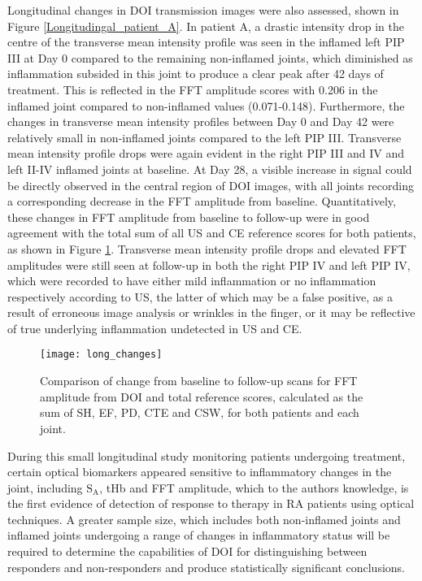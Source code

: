\documentclass[twoside]{bhamthesis}
\theoremstyle{definition}
\begin{document}
Longitudinal changes in DOI transmission images were also assessed, shown in Figure \ref{Longitudingal_patient_A}. In patient A, a drastic intensity drop in the centre of the transverse mean intensity profile was seen in the inflamed left PIP III at Day 0 compared to the remaining non-inflamed joints, which diminished as inflammation subsided in this joint to produce a clear peak after 42 days of treatment. This is reflected in the FFT amplitude scores with 0.206 in the inflamed joint compared to non-inflamed values (0.071-0.148). Furthermore, the changes in transverse mean intensity profiles between Day 0 and Day 42 were relatively small in non-inflamed joints compared to the left PIP III. Transverse mean intensity profile
drops were again evident in the right PIP III and IV and left II-IV inflamed joints at baseline. At Day 28, a visible increase in signal could be directly observed in the central region of DOI images, with all joints recording a corresponding decrease in the FFT amplitude from baseline. Quantitatively, these changes in FFT amplitude from baseline to follow-up were in good agreement with the total sum of all US and CE reference scores for both patients, as shown in Figure \ref{long_changes}. Transverse mean intensity profile
drops and elevated FFT amplitudes were still seen at follow-up in both the right PIP IV and left PIP IV, which were recorded to have either mild inflammation or no inflammation respectively according to US, the latter of which may be a false positive, as a result of erroneous image analysis or wrinkles in the finger, or it may be reflective of true underlying inflammation undetected in US and CE.


\begin{figure}[!ht]
\centering\texttt{[image: long\_changes]}\caption{Comparison of change from baseline to follow-up scans for FFT amplitude from DOI and total reference scores, calculated as the sum of SH, EF, PD, CTE and CSW, for both patients and each joint.}
\label{long_changes}
\end{figure}

During this small longitudinal study monitoring patients undergoing treatment, certain optical biomarkers appeared sensitive to inflammatory changes in the joint, including $\mathrm{S_A}$, tHb and FFT amplitude, which to the authors knowledge, is the first evidence of detection of response to therapy in RA patients using optical techniques. A greater sample size, which includes both non-inflamed joints and inflamed joints undergoing a range of changes in inflammatory status will be required to determine the capabilities of DOI for distinguishing between responders and non-responders and produce statistically significant conclusions. 
\end{document}
